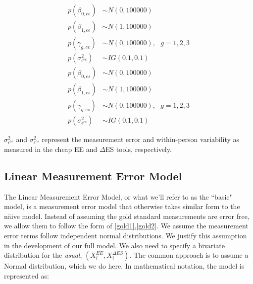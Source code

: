 \documentclass[11pt]{article}\usepackage[]{graphicx}\usepackage[]{color}
\begin{document}
\begin{multicols}{2}
\noindent 
\begin{align}
p(\beta_{0,ee}) &\sim N(0,100000) \\
p(\beta_{1,ee}) &\sim N(1,100000) \\
p(\gamma_{g,ee}) &\sim N(0,100000), \text{ } g=1,2,3 \\
p(\sigma^2_{\epsilon^{ee}}) &\sim IG(0.1,0.1) 
\end{align}
\columnbreak
\begin{align}
p(\beta_{0,es}) &\sim N(0,100000) \\
p(\beta_{1,es}) &\sim N(1,100000) \\
p(\gamma_{g,es}) &\sim N(0,100000), \text{ } g=1,2,3 \\
p(\sigma^2_{\epsilon^{es}}) &\sim IG(0.1,0.1) 
\end{align}
\end{multicols}

$\sigma^2_{\epsilon^{ee}}$ and $\sigma^2_{\epsilon^{es}}$ represent the measurement error and within-person variability as measured in the cheap EE and $\Delta$ES tools, respectively. 


\subsection{Linear Measurement Error Model}
The Linear Measurement Error Model, or what we'll refer to as the ``basic" model, is a measurement error model that otherwise takes similar form to the n{\"a}ive model. Instead of assuming the gold standard measurements are error free, we allow them to follow the form of \eqref{gold1},\eqref{gold2}. We assume the measurement error terms follow independent normal distributions. We justify this assumption in the development of our full model. We also need to specify a bivariate distribution for the \emph{usual}, $(X_i^{EE},X_i^{\Delta ES})$. The common approach is to assume a Normal distribution, which we do here. In mathematical notation, the model is represented as:
\end{document}
